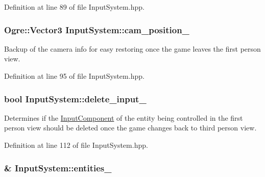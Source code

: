 Definition at line 89 of file Input\+System.\+hpp.

\subsubsection[{\texorpdfstring{cam\+\_\+position\+\_\+}{cam_position_}}]{\setlength{\rightskip}{0pt plus 5cm}Ogre\+::\+Vector3 Input\+System\+::cam\+\_\+position\+\_\+\hspace{0.3cm}{\ttfamily [private]}}\hypertarget{class_input_system_a06dc8cddfde4ecde07008cdb5bd4458e}{}\label{class_input_system_a06dc8cddfde4ecde07008cdb5bd4458e}


Backup of the camera info for easy restoring once the game leaves the first person view. 



Definition at line 95 of file Input\+System.\+hpp.

\subsubsection[{\texorpdfstring{delete\+\_\+input\+\_\+}{delete_input_}}]{\setlength{\rightskip}{0pt plus 5cm}bool Input\+System\+::delete\+\_\+input\+\_\+\hspace{0.3cm}{\ttfamily [private]}}\hypertarget{class_input_system_a549e0c521082a6ff97c2b9349d000cb0}{}\label{class_input_system_a549e0c521082a6ff97c2b9349d000cb0}


Determines if the \hyperlink{struct_input_component}{Input\+Component} of the entity being controlled in the first person view should be deleted once the game changes back to third person view. 



Definition at line 112 of file Input\+System.\+hpp.

\subsubsection[{\texorpdfstring{entities\+\_\+}{entities_}}]{\& Input\+System\+::entities\+\_\+\hspace{0.3cm}{\ttfamily [private]}}\hypertarget{class_input_system_ad7cd4d1cc1598f0d72c8531ba190ed94}{}\label{class_input_system_ad7cd4d1cc1598f0d72c8531ba190ed94}


